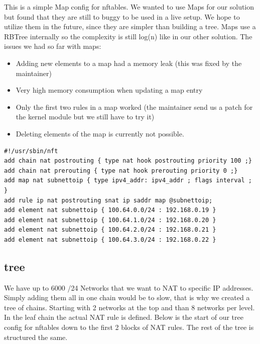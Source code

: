 \documentclass{report}
\begin{document}
This is a simple Map config for nftables. We wanted to use Maps for our
solution but found that they are still to buggy to be used in a live setup.
We hope to utilize them in the future, since they are simpler than building
a tree. Maps use a RBTree internally so the complexity is still
log(n) like in our other solution. The issues we had so far with maps:

\begin{itemize}
\itemsep1pt\parskip0pt
\item
  Adding new elements to a map had a memory leak (this was fixed by the
  maintainer)
\item
  Very high memory consumption when updating a map entry
\item
  Only the first two rules in a map worked (the maintainer send us a
  patch for the kernel module but we still have to try it)
\item
  Deleting elements of the map is currently not possible.
\end{itemize}

\begingroup
\fontsize{9pt}{9pt}\selectfont
\begin{verbatim}
#!/usr/sbin/nft
add chain nat postrouting { type nat hook postrouting priority 100 ;}
add chain nat prerouting { type nat hook prerouting priority 0 ;}
add map nat subnettoip { type ipv4_addr: ipv4_addr ; flags interval ; }
add rule ip nat postrouting snat ip saddr map @subnettoip;
add element nat subnettoip { 100.64.0.0/24 : 192.168.0.19 }
add element nat subnettoip { 100.64.1.0/24 : 192.168.0.20 }
add element nat subnettoip { 100.64.2.0/24 : 192.168.0.21 }
add element nat subnettoip { 100.64.3.0/24 : 192.168.0.22 }
\end{verbatim}
\endgroup

\subsection{tree}

We have up to 6000 /24 Networks that we want to NAT to specific IP addresses.
Simply adding them all in one chain would be to slow, that is why we
created a tree of chains. Starting with 2 networks at the top and than 8
networks per level. In the leaf chain the actual NAT rule is defined.
Below is the start of our tree config for nftables down to the first 2
blocks of NAT rules. The rest of the tree is structured the same.
\end{document}
